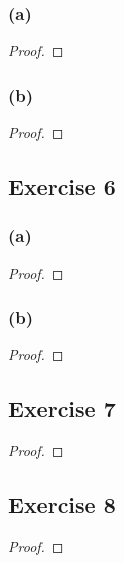 \documentclass[14pt]{extarticle}
\begin{document}
\subsubsection{(a)}

\begin{proof}

\end{proof}

\subsubsection{(b)}

\begin{proof}

\end{proof}

\subsection{Exercise 6}

\subsubsection{(a)}

\begin{proof}

\end{proof}

\subsubsection{(b)}

\begin{proof}

\end{proof}

\subsection{Exercise 7}

\begin{proof}

\end{proof}

\subsection{Exercise 8}

\begin{proof}

\end{proof}
\end{document}
